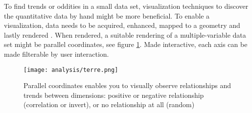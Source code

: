 To find trends or oddities in a small data set, visualization techniques to discover the quantitative data by hand might be more beneficial. To enable a visualization, data needs to be acquired, enhanced, mapped to a geometry and lastly rendered \citep{timo-ropinski-liu}. When rendered, a suitable rendering of a multiple-variable data set might be parallel coordinates, see figure \ref{fig:uneTerre}. Made interactive, each axis can be made filterable by user interaction.

\begin{figure}[h]
    \centering
    \texttt{[image: analysis/terre.png]}
    \caption{Parallel coordinates enables you to visually observe relationships and trends between dimensions: positive or negative relationship (correlation or invert), or no relationship at all (random) \citep{une-terre}}
    \label{fig:uneTerre}
\end{figure}








